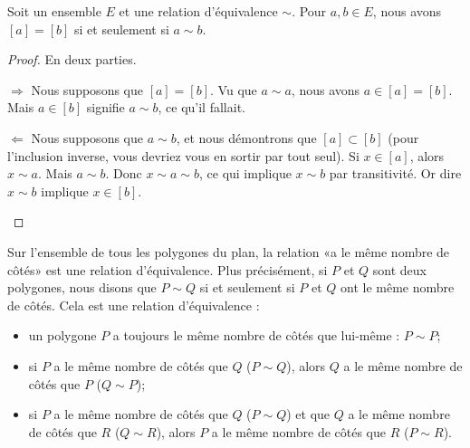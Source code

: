 \begin{lemma}
    Soit un ensemble \( E\) et une relation d'équivalence \( \sim\). Pour \( a,b\in E\), nous avons \( [a]=[b]\) si et seulement si \( a\sim b\).
\end{lemma}

\begin{proof}
    En deux parties.
    \begin{subproof}
        \item[\( \Rightarrow\)]
            Nous supposons que \( [a]=[b]\). Vu que \( a\sim a\), nous avons \( a\in [a]=[b]\). Mais \( a\in [b]\) signifie \( a\sim b\), ce qu'il fallait.
        \item[\( \Leftarrow\)]
            Nous supposons que \( a\sim b\), et nous démontrons que \( [a]\subset [b]\) (pour l'inclusion inverse, vous devriez vous en sortir par tout seul). Si \( x\in [a]\), alors \( x\sim a\). Mais \( a\sim b\). Donc \( x\sim a\sim b\), ce qui implique \( x\sim b\) par transitivité. Or dire \( x\sim b\) implique \( x\in [b]\).
    \end{subproof}
\end{proof}

\begin{example}
    Sur l'ensemble de tous les polygones du plan, la relation «a le même nombre de côtés» est une relation d'équivalence. Plus précisément, si $P$ et $Q$ sont deux polygones, nous disons que $P\sim Q$ si et seulement si $P$ et $Q$ ont le même nombre de côtés. Cela est une relation d'équivalence :
    \begin{itemize}
        \item
            un polygone $P$ a toujours le même nombre de côtés que lui-même : $P\sim P$;
        \item
            si $P$ a le même nombre de côtés que $Q$ ($P\sim Q$), alors $Q$ a le même nombre de côtés que $P$ ($Q\sim P$);
        \item
            si $P$ a le même nombre de côtés que $Q$ ($P\sim Q$) et que $Q$ a le même nombre de côtés que $R$ ($Q\sim R$), alors $P$ a le même nombre de côtés que $R$ ($P\sim R$).
    \end{itemize}
\end{example}

